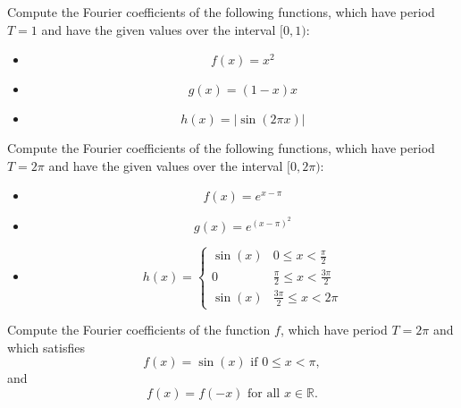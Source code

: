 \documentclass[11pt]{article}
\begin{document}
\begin{exercise}
    Compute the Fourier coefficients of the following functions, which have period $T = 1$ and have the given values over the interval $[0,1)$:
    \begin{itemize}
     \item 
     \[
        f(x) = x^{2}
     \]
     \item 
     \[
        g(x) = (1-x)x
     \]
     \item 
     \[
        h(x) = |\sin( 2 \pi x )|
     \]
    \end{itemize}
\end{exercise}
\begin{solution}     
\end{solution}

\begin{exercise}
    Compute the Fourier coefficients of the following functions, which have period $T = 2\pi$ and have the given values over the interval $[0,2\pi)$:
    \begin{itemize}
     \item 
     \[
        f(x) = e^{x - \pi}
     \]
     \item 
     \[
        g(x) = e^{(x - \pi)^2}
     \]
     \item 
     \[
        h(x) = \left\{\begin{array}{ll}
            \sin(x) & 0 \leq x < \frac \pi 2
            \\
            0   & \frac \pi 2 \leq x < \frac{3\pi}{2} 
            \\
            \sin(x) & \frac {3\pi} 2 \leq x < 2\pi
        \end{array}\right.
     \]
    \end{itemize}
\end{exercise}
\begin{solution}     
\end{solution}


\begin{exercise}
    Compute the Fourier coefficients of the function $f$, which have period $T = 2\pi$ and which satisfies 
     \[
        f(x) = \sin(x) \text{ if } 0 \leq x  < \pi,
     \]
     and 
     \[
        f(x) = f(-x) \text{ for all } x \in \mathbb R.
     \]
\end{exercise}
\begin{solution}     
\end{solution}
\end{document}
